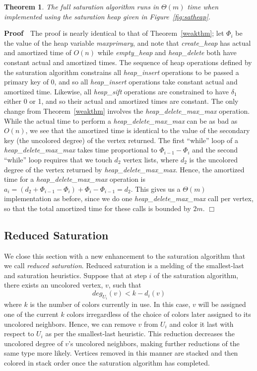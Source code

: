 \newtheorem{thm32}[thm31]{Theorem}
\begin{thm32}
\label{strongthm}
The full saturation algorithm runs in $\Theta(m)$ time when implemented
using the saturation heap given in Figure~\ref{fig:satheap}.
\end{thm32}

\noindent
{\bf Proof}\ \
The proof is nearly identical to that of Theorem~\ref{weakthm}; let $\Phi_i$
be the value of the heap variable {\em maxprimary}, and note that 
{\em create\_heap\/} has actual and amortized time of
$O(n)$ while {\em empty\_heap\/} and {\em heap\_delete\/} both have constant 
actual and amortized times.  The sequence of heap operations defined by the 
saturation algorithm constrains 
all {\em heap\_insert} operations to be passed a primary key of 0, and so all 
{\em heap\_insert\/} operations take constant actual and amortized time.  
Likewise, all {\em heap\_sift\/} operations are constrained to have 
$\delta_1$ either 0 or 1, and so their actual and amortized 
times are constant.  The only change from Theorem~\ref{weakthm} involves the 
{\em heap\_delete\_max\_max\/} operation.  While the actual time to perform a 
{\em heap\_delete\_max\_max\/} can be as bad as $O(n)$, we see that the 
amortized time is identical to the value of the secondary key (the uncolored 
degree) of the vertex returned.  The first ``while'' loop
of a {\em heap\_delete\_max\_max\/} takes time proportional to 
$\Phi_{i-1} - \Phi_i$ and the second ``while'' loop
requires that we touch $d_2$ vertex lists, where $d_2$ is the uncolored degree 
of the vertex returned by {\em heap\_delete\_max\_max\/}.  Hence, the 
amortized time for a {\em heap\_delete\_max\_max\/} operation is
$a_i  =  \left(d_2 + \Phi_{i-1} - \Phi_i \right) + \Phi_i - \Phi_{i-1} = d_2$.
This gives us a $\Theta(m)$ implementation as before, since we do one 
{\em heap\_delete\_max\_max\/} call per vertex, so that
the total amortized time for these calls is bounded by $2m$.
\hfill $\Box$
\medskip

\subsection{Reduced Saturation}
We close this section with a new enhancement to the saturation algorithm that 
we call {\em reduced saturation}.  Reduced saturation is a melding of the 
smallest-last~\cite{DUN1976,MAT1983} and saturation heuristics.  Suppose that 
at step $i$ of the saturation algorithm, there exists an uncolored vertex, 
$v$, such that 
\[
deg_{U_i}(v) < k - d_i(v)
\]
where $k$ is the number of colors currently in use.  In this case, $v$ will be
assigned one of the current $k$ colors irregardless of the choice of colors 
later assigned to its uncolored neighbors.  Hence, we can remove $v$ from 
$U_i$ and color it last with respect to $U_i$ as per the smallest-last 
heuristic.  This reduction decreases the uncolored degree of $v$'s uncolored 
neighbors, making further reductions of the same type more likely.  Vertices 
removed in this manner are stacked and then colored in stack order once the 
saturation algorithm has completed.  

